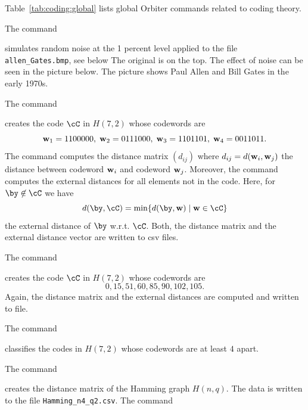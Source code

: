 Table~\ref{tab:coding:global} lists global Orbiter commands related to coding theory. 

\bigskip



The command 


simulates random noise at the 1 percent level 
applied to the file \verb'allen_Gates.bmp', see below
The original is on the top. 
The effect of noise can be seen in the picture below.
The picture 
shows Paul Allen and Bill Gates in the early 1970s. 

\bigskip

The command


creates the code $\cC$ in $H(7,2)$ whose codewords are 
$$
{\bf w}_1 = 1100000, \; 
{\bf w}_2 = 0111000, \; 
{\bf w}_3  = 1101101, \; 
{\bf w}_4  = 0011011.
$$
The command computes the distance matrix $(d_{ij})$ where 
$d_{ij} = d({\bf w}_i,{\bf w}_j)$ 
the distance between codeword ${\bf w}_i$ and codeword ${\bf w}_j$.
Moreover, the command computes the external distances for all elements not in the code. 
Here, for $\by \not\in \cC$ we have 
$$
d(\by,\cC) = \min \{ d(\by,{\bf w}) \mid {\bf w} \in \cC \}
$$
the external distance of $\by$ w.r.t. $\cC$.
Both, the distance matrix and the external distance vector are written to csv files.

\bigskip

The command


creates the code $\cC$ in $H(7,2)$ whose codewords are 
$$
0,15,51,60,85,90,102,105.
$$
Again, the distance matrix and the external distances are computed and written to file.

\bigskip


The command


classifies the codes in $H(7,2)$ whose codewords are at least $4$ apart.

\bigskip




The command


creates the distance matrix of the Hamming graph $H(n,q).$ 
The data is written to the file \verb'Hamming_n4_q2.csv'. 
The command

